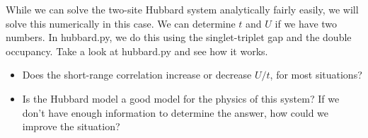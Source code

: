 \documentclass[12pt]{article}
\begin{document}
While we can solve the two-site Hubbard system analytically fairly easily, we will solve this numerically in this case. 
We can determine $t$ and $U$ if we have two numbers. 
In hubbard.py, we do this using the singlet-triplet gap and the double occupancy. 
Take a look at hubbard.py and see how it works.

\begin{itemize}
\item Does the short-range correlation increase or decrease $U/t$, for most situations?
\item Is the Hubbard model a good model for the physics of this system? If we don't have enough information to determine the answer, how could we improve the situation?
\end{itemize}
\end{document}
